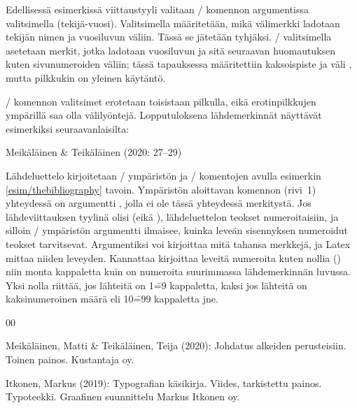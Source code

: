\noindent
Edellisessä esimerkissä viittaustyyli valitaan \-/
komennon argumentissa valitsimella 
(tekijä\--vuosi). Valitsimella  määritetään, mikä
välimerkki ladotaan tekijän nimen ja vuosiluvun väliin. Tässä se
jätetään tyhjäksi. \-/ valitsimella asetetaan merkit,
jotka ladotaan vuosiluvun ja sitä seuraavan huomautuksen kuten
sivunumeroiden väliin; tässä tapauksessa määritettiin kaksoispiste ja
väli \koodi{\{:~\}}, mutta pilkkukin on yleinen käytäntö.

\-/ komennon valitsimet erotetaan toisistaan
pilkulla, eikä erotinpilkkujen ympärillä saa olla välilyöntejä.
Lopputuloksena lähdemerkinnät näyttävät esimerkiksi seuraavanlaisilta:

\begin{koodilohkosis}
\citet*[27--29]{johdatus} %
\end{koodilohkosis}

\begin{tulossis}
  Meikäläinen \& Teikäläinen (2020: 27--29)
\end{tulossis}

\noindent
Lähdeluettelo kirjoitetaan \-/ ympäristön ja
\-/ komentojen avulla esimerkin
\ref{esim/thebibliography} tavoin. Ympäristön aloittavan komennon
(rivi~1) yhteydessä on argumentti , jolla ei ole tässä
yhteydessä merkitystä. Jos lähdeviittauksen tyylinä olisi
 (eikä ), lähdeluettelon teokset
numeroitaisiin, ja silloin \-/ ympäristön
argumentti ilmaisee, kuinka leveän sisennyksen numeroidut teokset
tarvitsevat. Argumentiksi voi kirjoittaa mitä tahansa merkkejä, ja Latex
mittaa niiden leveyden. Kannattaa kirjoittaa leveitä numeroita kuten
nollia () niin monta kappaletta kuin on numeroita suurimmassa
lähdemerkinnän luvussa. Yksi nolla riittää, jos lähteitä on 1\==9
kappaletta, kaksi jos lähteitä on kaksinumeroinen määrä eli 10\==99
kappaletta jne.

\begin{esimerkki*}

\begin{koodilohko}
\begin{thebibliography}{00}

  Meikäläinen, Matti \& Teikäläinen, Teija (2020): Johdatus alkeiden
  perusteisiin. Toinen painos. Kustantaja oy.

 Itkonen, Markus (2019): Typografian
  käsikirja. Viides, tarkistettu painos. Typoteekki. Graafinen
  suunnittelu Markus Itkonen oy.

\end{thebibliography}
\end{koodilohko}
  \caption{Lähdeluettelon kirjoittaminen \-/
    ympäristön ja \-/ komentojen avulla.}
  \label{esim/thebibliography}
\end{esimerkki*}


